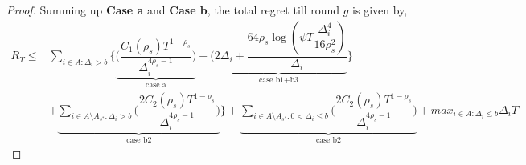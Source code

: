\begin{proof}
Summing up \textbf{Case a} and \textbf{Case b}, the total regret till round $g$ is given by,
\begin{align*}
  R_{T} \leq &  \sum_{i\in A:\Delta_{i} > b}\bigg\lbrace\underbrace{\bigg(\dfrac{C_{1}(\rho_{s})T^{1-\rho_{s}}}{\Delta_{i}^{4\rho_{s}-1}}\bigg)}_{\text{case a}} + \underbrace{\bigg(2\Delta_{i}+\dfrac{64\rho_{s}\log{(\psi T\dfrac{\Delta_{i}^{4}}{16\rho_{s}^{2}})}}{\Delta_{i}} }_{\text{case b1+b3}} \bigg\rbrace
  \\&+ \underbrace{\sum_{i\in A\setminus A_{s^*}: \Delta_{i} > b}\bigg(\dfrac{2C_{2}(\rho_{s})T^{1-\rho_{s}}}{\Delta_{i}^{4\rho_{s} -1}} \bigg)}_{\text{case b2}} \bigg\rbrace  + \underbrace{\sum_{i\in A\setminus A_{s^*}:0 < \Delta_{i}\leq b}\bigg(\dfrac{2C_{2}(\rho_{s})T^{1-\rho_{s}}}{\Delta_{i}^{4\rho_{s} -1}} \bigg)}_{\text{case b2}}  + max_{i\in A:\Delta_{i}\leq b}\Delta_{i}T
\end{align*}



\end{proof}
